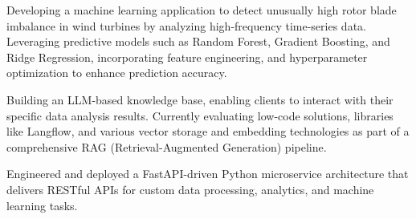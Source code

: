 \begin{tightemize}
    \item Developing a machine learning application to detect unusually high rotor blade imbalance in wind turbines by analyzing high-frequency time-series data. Leveraging predictive models such as Random Forest, Gradient Boosting, and Ridge Regression, incorporating feature engineering, and hyperparameter optimization to enhance prediction accuracy.

    \item Building an LLM-based knowledge base, enabling clients to interact with their specific data analysis results. Currently evaluating low-code solutions, libraries like Langflow, and various vector storage and embedding technologies as part of a comprehensive RAG (Retrieval-Augmented Generation) pipeline.

    \item Engineered and deployed a FastAPI-driven Python microservice architecture that delivers RESTful APIs for custom data processing, analytics, and machine learning tasks.
\end{tightemize}
